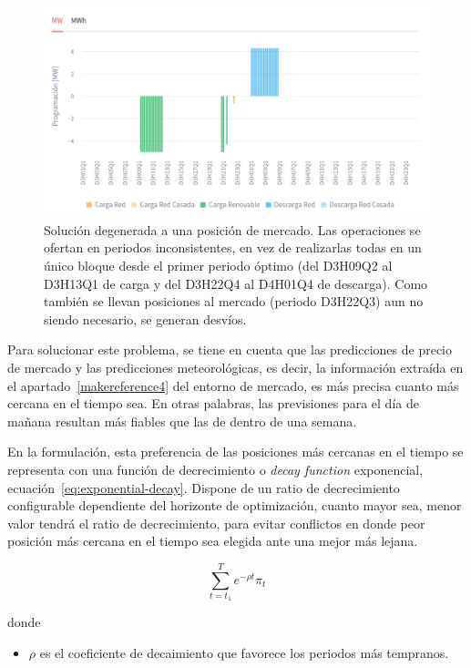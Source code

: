\begin{figure}
  \centering
  \includegraphics[width=0.75\linewidth]{figures/solucion-degenerada.png}
  \caption[Solución degenerada.]{Solución degenerada a una posición de mercado. Las operaciones se ofertan en periodos inconsistentes, en vez de realizarlas todas en un único bloque desde el primer periodo óptimo (del D3H09Q2 al D3H13Q1 de carga y del D3H22Q4 al D4H01Q4 de descarga). Como también se llevan posiciones al mercado (periodo D3H22Q3) aun no siendo necesario, se generan desvíos.}%
  \label{fig:solucion-degenerada}
\end{figure}

Para solucionar este problema, se tiene en cuenta que las predicciones de precio de mercado y las predicciones meteorológicas, es decir, la información extraída en el apartado~\ref{makereference4} del entorno de mercado, es más precisa cuanto más cercana en el tiempo sea. En otras palabras, las previsiones para el día de mañana resultan más fiables que las de dentro de una semana.

En la formulación, esta preferencia de las posiciones más cercanas en el tiempo se representa con una función de decrecimiento o \textit{decay function} exponencial, ecuación~\ref{eq:exponential-decay}. Dispone de un ratio de decrecimiento configurable dependiente del horizonte de optimización, cuanto mayor sea, menor valor tendrá el ratio de decrecimiento, para evitar conflictos en donde peor posición más cercana en el tiempo sea elegida ante una mejor más lejana.

\begin{samepage}

  \begin{equation}%
    \label{eq:exponential-decay}
    \sum_{t = t_{1}}^{T} e^{-\rho t} \pi_{t}
  \end{equation}

  donde

  \begin{itemize}
    \item \( \rho \) es el coeficiente de decaimiento que favorece los periodos más tempranos.
  \end{itemize}

\end{samepage}

